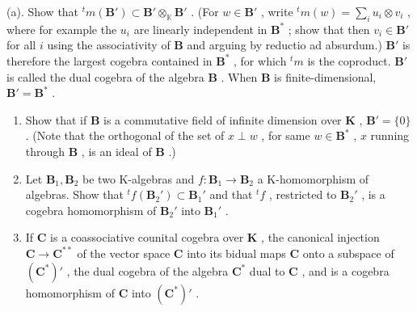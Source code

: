 (a). Show that \({}^t m(\mathbf{B}') \subset \mathbf{B}' \otimes_{\mathbb{K}} \mathbf{B}'\) . (For \(w \in \mathbf{B}'\) , write \({}^t m(w) = \sum_i u_i \otimes v_i\) , where for example the \(u_i\) are linearly independent in \(\mathbf{B}^*\) ; show that then \(v_i \in \mathbf{B}'\) for all \(i\) using the associativity of \(\mathbf{B}\) and arguing by reductio ad absurdum.) \(\mathbf{B}'\) is therefore the largest cogebra contained in \(\mathbf{B}^*\) , for which \({}^t m\) is the coproduct. \(\mathbf{B}'\) is called the dual cogebra of the algebra \(\mathbf{B}\) . When \(\mathbf{B}\) is finite-dimensional, \(\mathbf{B}' = \mathbf{B}^*\) .

\begin{enumerate}
\def\labelenumi{(\alph{enumi})}
\setcounter{enumi}{2}
\item
  Show that if \(\mathbf{B}\) is a commutative field of infinite dimension over \(\mathbf{K}\) , \(\mathbf{B}' = \{0\}\) . (Note that the orthogonal of the set of \(x \perp w\) , for same \(w \in \mathbf{B}^*\) , \(x\) running through \(\mathbf{B}\) , is an ideal of \(\mathbf{B}\) .)
\item
  Let \(\mathbf{B}_1, \mathbf{B}_2\) be two K-algebras and \(f: \mathbf{B}_1 \to \mathbf{B}_2\) a K-homomorphism of algebras. Show that \(^t f(\mathbf{B}_2') \subset \mathbf{B}_1'\) and that \(^t f\) , restricted to \(\mathbf{B}_2'\) , is a cogebra homomorphism of \(\mathbf{B}_2'\) into \(\mathbf{B}_1'\) .
\item
  If \(\mathbf{C}\) is a coassociative counital cogebra over \(\mathbf{K}\) , the canonical injection \(\mathbf{C} \to \mathbf{C}^{**}\) of the vector space \(\mathbf{C}\) into its bidual maps \(\mathbf{C}\) onto a subspace of \((\mathbf{C}^*)'\) , the dual cogebra of the algebra \(\mathbf{C}^*\) dual to \(\mathbf{C}\) , and is a cogebra homomorphism of \(\mathbf{C}\) into \((\mathbf{C}^*)'\) .
\end{enumerate}

